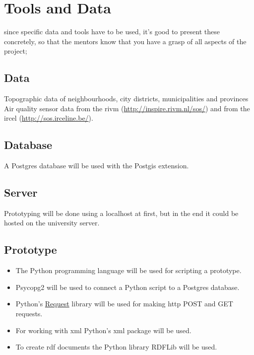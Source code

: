 \chapter{Tools and Data}
\label{chap:TD}

since specific data and tools have to be used, it’s good to present these concretely, so that the mentors know that you have a grasp of all aspects of the project;

\section{Data}
Topographic data of neighbourhoods, city districts, municipalities and provinces\\
Air quality sensor data from the \ac{rivm} (\url{http://inspire.rivm.nl/sos/}) and from the \ac{ircel} (\url{http://sos.irceline.be/}).

\section{Database}
A Postgres database will be used with the Postgis extension.

\section{Server}
Prototyping will be done using a localhost at first, but in the end it could be hosted on the university server.

\section{Prototype}
\begin{itemize}
	\item The Python programming language will be used for scripting a prototype. 
	\item Psycopg2 will be used to connect a Python script to a Postgres database.
	\item Python's \href{http://docs.python-requests.org/en/latest/user/quickstart/}{Request} library will be used for making \ac{http} POST and GET requests. 
	\item For working with \ac{xml} Python's xml package will be used.
	\item To create \ac{rdf} documents the Python library RDFLib will be used. 
\end{itemize}









  

